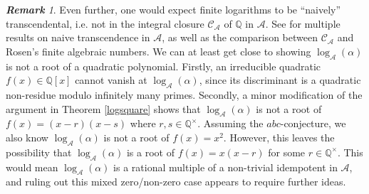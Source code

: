 \documentclass[12pt,reqno]{amsart}
\theoremstyle{remark}
\newtheorem{remark}[theorem]{\bf Remark}
\newcommand{\cA}{\mathcal A}
\newcommand{\cC}{\mathcal C}
\begin{document}
\begin{remark}
Even further, one would expect finite logarithms to be ``naively'' transcendental, i.e. not in the integral closure $\cC_\cA$ of $\mathbb{Q}$ in $\cA$. See \cite{MS26} for multiple results on naive transcendence in $\cA$, as well as the comparison between $\cC_\cA$ and Rosen's finite algebraic numbers. 
We can at least get close to showing $\log_\cA(\alpha)$ is not a root of a quadratic polynomial. 
Firstly, an irreducible quadratic $f(x)\in\mathbb{Q}[x]$ cannot vanish at $\log_\cA(\alpha)$, since its discriminant is a quadratic non-residue modulo infinitely many primes. 
Secondly, a minor modification of the argument in Theorem \ref{logsquare} shows that $\log_\cA(\alpha)$ is not a root of $f(x)=(x-r)(x-s)$ where $r,s\in\mathbb{Q}^\times$. Assuming the $abc$-conjecture, we also know $\log_\cA(\alpha)$ is not a root of $f(x)=x^2$. 
However, this leaves the possibility that $\log_\cA(\alpha)$ is a root of $f(x)=x(x-r)$ for some $r\in\mathbb{Q}^\times$. This would mean $\log_\cA(\alpha)$ is a rational multiple of a non-trivial idempotent in $\cA$, and ruling out this mixed zero/non-zero case appears to require further ideas.
\end{remark}
\end{document}
